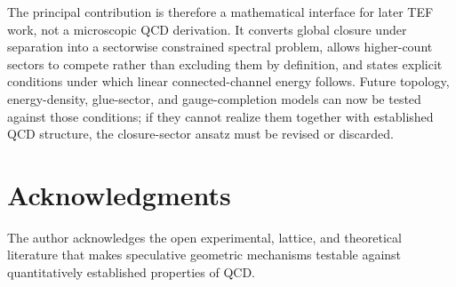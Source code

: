 \documentclass[10pt]{article}
\begin{document}
The principal contribution is therefore a mathematical interface for later TEF work, not a microscopic QCD derivation. It converts global closure under separation into a sectorwise constrained spectral problem, allows higher-count sectors to compete rather than excluding them by definition, and states explicit conditions under which linear connected-channel energy follows. Future topology, energy-density, glue-sector, and gauge-completion models can now be tested against those conditions; if they cannot realize them together with established QCD structure, the closure-sector ansatz must be revised or discarded.

\section*{Acknowledgments}
\nopagebreak[4]
The author acknowledges the open experimental, lattice, and theoretical literature that makes speculative geometric mechanisms testable against quantitatively established properties of QCD.
\end{document}
